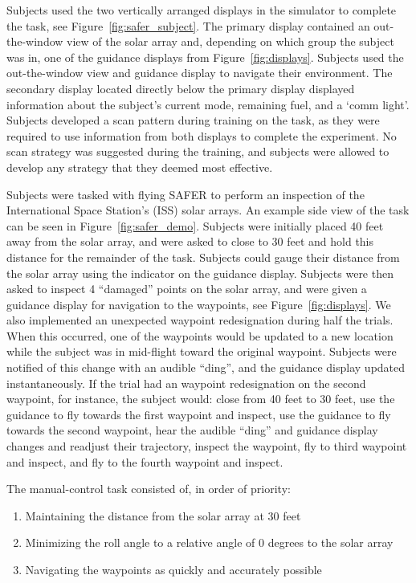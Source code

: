 \documentclass[]{aiaa-tc}%
\begin{document}
Subjects used the two vertically arranged displays in the simulator to complete the task, see Figure~\ref{fig:safer_subject}. The primary display contained an out-the-window view of the solar array and, depending on which group the subject was in, one of the guidance displays from Figure~\ref{fig:displays}. Subjects used the out-the-window view and guidance display to navigate their environment. The secondary display located directly below the primary display displayed information about the subject's current mode, remaining fuel, and a `comm light'. Subjects developed a scan pattern during training on the task, as they were required to use information from both displays to complete the experiment. No scan strategy was suggested during the training, and subjects were allowed to develop any strategy that they deemed most effective.

Subjects were tasked with flying SAFER to perform an inspection of the International Space Station's (ISS) solar arrays. An example side view of the task can be seen in Figure~\ref{fig:safer_demo}. Subjects were initially placed 40 feet away from the solar array, and were asked to close to 30 feet and hold this distance for the remainder of the task. Subjects could gauge their distance from the solar array using the indicator on the guidance display. Subjects were then asked to inspect 4 ``damaged'' points on the solar array, and were given a guidance display for navigation to the waypoints, see Figure~\ref{fig:displays}. We also implemented an unexpected waypoint redesignation during half the trials. When this occurred, one of the waypoints would be updated to a new location while the subject was in mid-flight toward the original waypoint. Subjects were notified of this change with an audible ``ding'', and the guidance display updated instantaneously. If the trial had an waypoint redesignation on the second waypoint, for instance, the subject would: close from 40 feet to 30 feet, use the guidance to fly towards the first waypoint and inspect, use the guidance to fly towards the second waypoint, hear the audible ``ding'' and guidance display changes and readjust their trajectory, inspect the waypoint, fly to third waypoint and inspect, and fly to the fourth waypoint and inspect.

The manual-control task consisted of, in order of priority:
\begin{enumerate}
  \itemsep0em
  \item Maintaining the distance from the solar array at 30 feet
  \item Minimizing the roll angle to a relative angle of 0 degrees to the solar array
  \item Navigating the waypoints as quickly and accurately possible
\end{enumerate}
\end{document}
